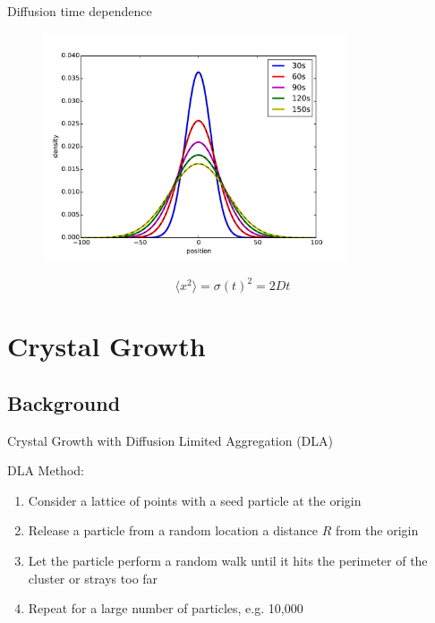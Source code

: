 \documentclass{beamer}
\begin{document}
\begin{frame}{Diffusion time dependence}

\begin{figure}[H]
	\centering
	\includegraphics[width=0.8\textwidth]{diffusion.pdf}
\end{figure}
\begin{equation}
\langle x^2\rangle=\sigma(t)^2=2Dt
\end{equation}

\end{frame}


\section{Crystal Growth}


\subsection{Background}

\begin{frame}{Crystal Growth with Diffusion Limited Aggregation (DLA)}

DLA Method:

\begin{enumerate}

\item Consider a lattice of points with a seed particle at the origin

\item Release a particle from a random location a distance $R$ from the origin

\item Let the particle perform a random walk until it hits the perimeter of the cluster or strays too far

\item Repeat for a large number of particles, e.g. 10,000

\end{enumerate}

\end{frame}
\end{document}
